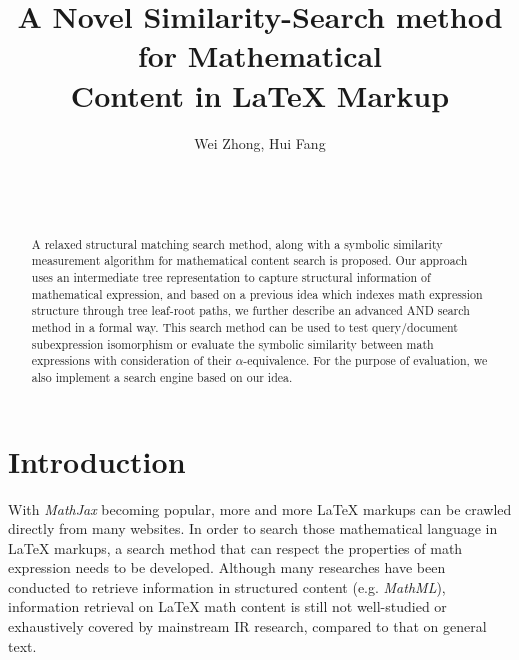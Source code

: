 \documentclass{acm_proc_article-sp}
\begin{document}
\title{A Novel Similarity-Search method for Mathematical \\ Content in {\ttlit LaTeX} Markup}

\author{
\alignauthor Wei Zhong,\; Hui Fang\\
       \\
       \\
       \\
}

\maketitle
\begin{abstract}
A relaxed structural matching search method, along with a symbolic similarity measurement algorithm for mathematical content search is proposed. 
Our approach uses an intermediate tree representation to capture structural information of mathematical expression, and based on a previous idea which indexes math expression structure through tree leaf-root paths, we further describe an advanced AND search method in a formal way. This search method can be used to test query/document subexpression isomorphism or evaluate the symbolic similarity between math expressions with consideration of their $\alpha$-equivalence. 
For the purpose of evaluation, we also implement a search engine based on our idea. 
\end{abstract}



\section{Introduction}
\label{intro}
With \textit{MathJax} becoming popular, more and more \LaTeX{} markups can be crawled directly from many websites. 
In order to search those mathematical language in \LaTeX{} markups, a search method that can respect the properties of math expression needs to be developed. 
Although many researches have been conducted to retrieve information in structured content (e.g. \textit{MathML}), information retrieval on \LaTeX{} math content is still not well-studied or exhaustively covered by mainstream IR research, compared to that on general text.
\end{document}
